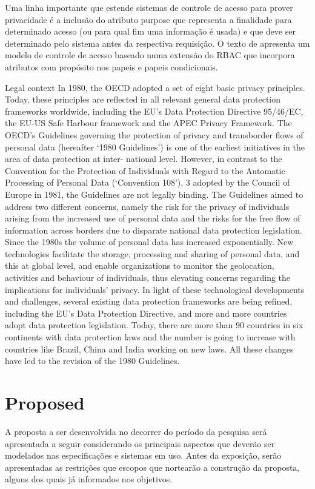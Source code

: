 \documentclass{doublecol-new}
\begin{document}
Uma linha importante que estende sistemas de controle de acesso para prover privacidade é a inclusão do atributo purpose que representa a finalidade para determinado acesso (ou para qual fim uma informação é usada) e que deve ser determinado pelo sistema antes da respectiva requisição. O texto de \cite{byun2005purpose} apresenta um modelo de controle de acesso baseado numa extensão do RBAC que incorpora atributos com propósito nos papeis e papeis condicionais.

\cite{kuschewsky2014new}
Legal context
In 1980, the OECD adopted a set of eight basic privacy principles. Today, these principles are reflected in all relevant general data protection frameworks worldwide, including the EU’s Data Protection Directive 95/46/EC, the EU-US Safe Harbour framework and the APEC Privacy Framework. The OECD’s Guidelines governing the protection of privacy and transborder flows of
personal data (hereafter ‘1980 Guidelines’) is one of the earliest initiatives in the area of data protection at inter-
national level. However, in contrast to the Convention for the Protection of Individuals with Regard to the Automatic Processing of Personal Data (‘Convention 108’), 3 adopted by the Council of Europe in 1981, the Guidelines are not legally binding. The Guidelines aimed to address two different concerns, namely the risk for the privacy of individuals arising from the increased use of personal data and the risks for the free flow of information across borders due to disparate national data protection legislation. Since the 1980s the volume of personal data has increased exponentially. New technologies facilitate the storage, processing and sharing of personal data, and this at global level, and enable organizations to monitor the geolocation, activities and behaviour of individuals, thus elevating concerns regarding the implications for individuals’ privacy. In light of these technological developments and challenges, several existing data protection frameworks are being refined, including the EU’s Data Protection Directive, and more and more countries adopt data protection legislation. Today, there are more than 90 countries in six continents with data protection laws and the number is going to increase with countries like Brazil, China and India working on new laws. All these changes have led to the revision of the 1980 Guidelines.



\section{Proposed}
A proposta a ser desenvolvida no decorrer do período da pesquisa será apresentada a seguir considerando os principais aspectos que deverão ser modelados nas especificações e sistemas em uso. Antes da exposição, serão apresentadas as restrições que escopos que nortearão a construção da proposta, alguns dos quais já informados nos objetivos.
\end{document}

